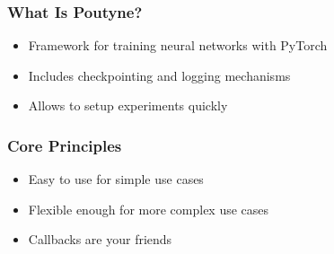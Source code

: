 \documentclass[french,english,usenames,dvipsnames]{beamer}
\begin{document}
\begin{frame}[nonum]
\begin{center}
\begin{columns}
\begin{column}{0.33\textwidth}
                \end{column}
            \end{columns}
        \end{center}
    \end{frame}

    \begin{frame}
        \frametitle{What Is Poutyne?}
        \begin{itemize}
            \item Framework for training neural networks with PyTorch
            \item Includes checkpointing and logging mechanisms
            \item Allows to setup experiments quickly
        \end{itemize}
    \end{frame}

    \begin{frame}
        \frametitle{Core Principles}
        \begin{itemize}
            \item Easy to use for simple use cases
            \item Flexible enough for more complex use cases
            \item Callbacks are your friends
        \end{itemize}
    \end{frame}
\end{document}
